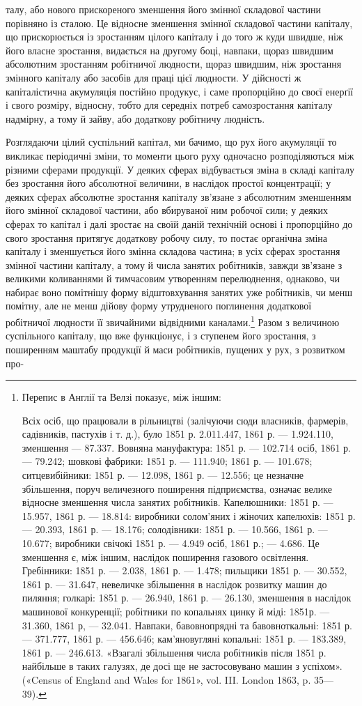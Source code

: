 талу, або нового прискореного зменшення його змінної складової
частини порівняно із сталою. Це відносне зменшення змінної
складової частини капіталу, що прискорюється із зростанням
цілого капіталу і до того ж куди швидше, ніж його власне зростання,
видається на другому боці, навпаки, щораз швидшим
абсолютним зростанням робітничої людности, щораз швидшим,
ніж зростання змінного капіталу або засобів для праці цієї людности.
У дійсності ж капіталістична акумуляція постійно продукує,
і саме пропорційно до своєї енерґії і свого розміру, відносну,
тобто для середніх потреб самозростання капіталу надмірну,
а тому й зайву, або додаткову робітничу людність.

Розглядаючи цілий суспільний капітал, ми бачимо, що рух
його акумуляції то викликає періодичні зміни, то моменти цього
руху одночасно розподіляються між різними сферами продукції.
У деяких сферах відбувається зміна в складі капіталу без зростання
його абсолютної величини, в наслідок простої концентрації;
у деяких сферах абсолютне зростання капіталу зв’язане з абсолютним
зменшенням його змінної складової частини, або вбируваної
ним робочої сили; у деяких сферах то капітал і далі зростає
на своїй даній технічній основі і пропорційно до свого зростання
притягує додаткову робочу силу, то постає органічна зміна капіталу
і зменшується його змінна складова частина; в усіх сферах
зростання змінної частини капіталу, а тому й числа занятих
робітників, завжди зв’язане з великими коливаннями й тимчасовим
утворенням перелюднення, однаково, чи набирає воно
помітнішу форму відштовхування занятих уже робітників, чи
менш помітну, але не менш дійову форму утрудненого поглинення
додаткової робітничої людности її звичайними відвідними каналами.\footnote{
Перепис в Англії та Велзі показує, між іншим:

Всіх осіб, що працювали в рільництві (залічуючи сюди власників,
фармерів, садівників, пастухів і т. д.), було 1851 р. 2.011.447, 1861 р. —
1.924.110, зменшення — 87.337. Вовняна мануфактура: 1851 р. — 102.714
осіб, 1861 р. — 79.242; шовкові фабрики: 1851 р. — 111.940; 1861 р. —
101.678; ситцевибійники: 1851 р. — 12.098, 1861 р. — 12.556; це незначне
збільшення, поруч величезного поширення підприємства, означає
велике відносне зменшення числа занятих робітників. Капелюшники:
1851 р. — 15.957, 1861 р. — 18.814: виробники солом’яних і жіночих капелюхів:
1851 р. — 20.393, 1861 р. — 18.176; солодівники: 1851 р. —
10.566, 1861 р. — 10.677; виробники свічокі 1851 р. — 4.949 осіб, 1861 р.; —
4.686. Це зменшення є, між іншим, наслідок поширення газового освітлення.
Гребінники: 1851 р. — 2.038, 1861 р. — 1.478; пильщики 1851 р. —
30.552, 1861 р. — 31.647, невеличке збільшення в наслідок розвитку
машин до пиляння; голкарі: 1851 р. — 26.940, 1861 р. — 26.130, зменшення
в наслідок машинової конкуренції; робітники по копальнях цинку й
міді: 1851р. — 31.360, 1861 р, — 32.041. Навпаки, бавовнопрядні та бавовноткальні:
1851 р. — 371.777, 1861 р. — 456.646; кам’яновугляні копальні:
1851 р. — 183.389, 1861 р. — 246.613. «Взагалі збільшення числа робітників
після 1851 р. найбільше в таких галузях, де досі ще не застосовувано
машин з успіхом». («Census of England and Wales for 1861», vol. III.
London 1863, p. 35—39).
}
Разом з величиною суспільного капіталу, що вже функціонує,
і з ступенем його зростання, з поширенням маштабу
продукції й маси робітників, пущених у рух, з розвитком про-